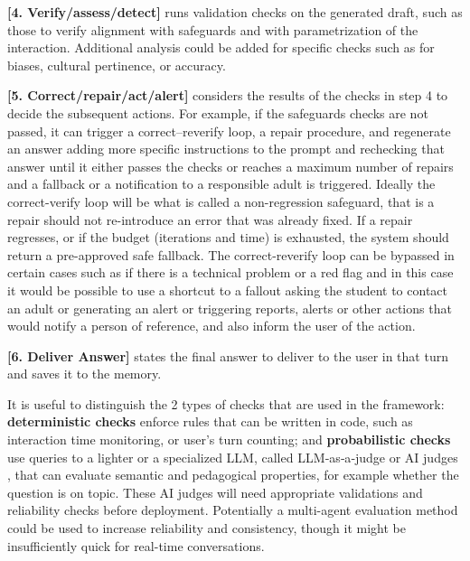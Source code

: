 \documentclass[fleqn,10pt]{wlscirep}
\begin{document}
\textbf{[4. Verify/assess/detect]} runs validation checks on the generated draft, such as those to verify alignment with safeguards and with parametrization of the interaction. Additional analysis could be added for specific checks such as for biases, cultural pertinence, or accuracy.

\textbf{[5. Correct/repair/act/alert]} considers the results of the checks in step 4 to decide the subsequent actions. For example, if the safeguards checks are not passed, it can trigger a correct–reverify loop, a repair procedure, and regenerate an answer adding more specific instructions to the prompt and rechecking that answer until it either passes the checks or reaches a maximum number of repairs and a fallback or a notification to a responsible adult is triggered. Ideally the correct-verify loop will be what is called a non-regression safeguard, that is a repair should not re-introduce an error that was already fixed. If a repair regresses, or if the budget (iterations and time) is exhausted, the system should return a pre-approved safe fallback. The correct-reverify loop can be bypassed in certain cases such as if there is a technical problem or a red flag and in this case it would be possible to use a shortcut to a fallout asking the student to contact an adult or generating an alert or triggering reports, alerts or other actions that would notify a person of reference, and also inform the user of the action.

\textbf{[6. Deliver Answer]} states the final answer to deliver to the user in that turn and saves it to the memory.

It is useful to distinguish the 2 types of checks that are used in the framework: \textbf{deterministic checks} enforce rules that can be written in code, such as interaction time monitoring, or user's turn counting; and \textbf{probabilistic checks} use queries to a lighter or a specialized LLM, called LLM‑as‑a‑judge or AI judges \cite{Baysan2025, Gu2026}, that can evaluate semantic and pedagogical properties, for example whether the question is on topic. These AI judges will need appropriate validations and reliability checks before deployment. Potentially a multi-agent evaluation method could be used to increase reliability and consistency, though it might be insufficiently quick for real-time conversations.
\end{document}
